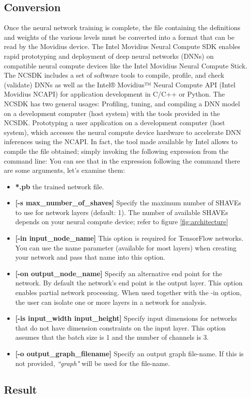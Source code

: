 \subsection{Conversion}
\label{subsection:conversion}
Once the neural network training is complete, the file containing the 
definitions and weights of the various levels must be converted into a format 
that can be read by the Movidius device.
The Intel Movidius Neural Compute SDK enables rapid prototyping and deployment 
of deep neural networks (DNNs) on compatible neural compute devices like the 
Intel Movidius Neural Compute Stick. 
The NCSDK includes a set of software tools to compile, profile, and check 
(validate) DNNs as well as the Intel® Movidius™ Neural Compute API (Intel 
Movidius NCAPI) for application development in C/C++ or Python.
The NCSDK has two general usages:
Profiling, tuning, and compiling a DNN model on a development computer 
(host system) with the tools provided in the NCSDK.
Prototyping a user application on a development computer (host system), 
which accesses the neural compute device hardware to accelerate DNN inferences 
using the NCAPI. 
In fact, the tool made available by Intel allows to compile the file obtained; 
simply invoking the following expression from the command line:
%
%
You can see that in the expression following the command there are some 
arguments, let's examine them:
\begin{itemize}
\item \textbf{*.pb} the trained network file.
\item \textbf{[-s max\_number\_of\_shaves]} Specify the maximum number of SHAVEs 
to use for network layers (default: 1).
The number of available SHAVEs depends on your neural compute device; refer to 
figure \ref{fig:architecture}
\item \textbf{[-in input\_node\_name]} This option is required for TensorFlow 
networks. 
You can use the name parameter (available for most layers) when creating your 
network and pass that name into this option.
\item \textbf{[-on output\_node\_name]} Specify an alternative end point for the 
network. 
By default the network’s end point is the output layer. 
This option enables partial network processing. When used together with the 
-in option, the user can isolate one or more layers in a network for analysis.
\item \textbf{[-is input\_width input\_height]} Specify input dimensions for 
networks that do not have dimension constraints on the input layer.
This option assumes that the batch size is 1 and the number of channels is 3.
\item \textbf{[-o output\_graph\_filename]} Specify an output graph file-name. 
If this is not provided, \emph{``graph"} will be used for the file-name.
\end{itemize}

\subsection{Result}
\label{subsec:result}




